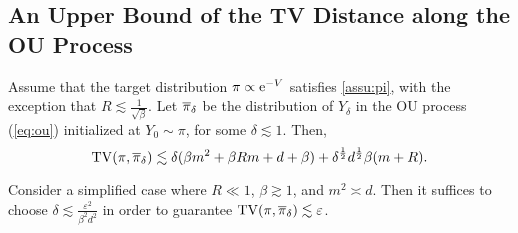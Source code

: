 \subsection{An Upper Bound of the TV Distance along the OU Process}
\label{app:prf:tv_ou}
\begin{lemma}
  Assume that the target distribution $\pi\propto\mathrm{e}^{-V}$ satisfies \cref{assu:pi}, with the exception that $R\lesssim\frac{1}{\sqrt{\beta}}$. Let $\overline{\pi}_\delta$ be the distribution of $Y_\delta$ in the OU process (\cref{eq:ou}) initialized at $Y_0\sim\pi$, for some $\delta\lesssim1$. Then,
  $$\operatorname{TV}(\pi,\overline{\pi}_\delta)\lesssim\delta(\beta m^2+\beta Rm+d+\beta)+\delta^{\frac12}d^{\frac12}\beta(m+R).$$ 
  \label{lem:ou_tv}
\end{lemma}
\begin{remark}
  Consider a simplified case where $R\ll1$, $\beta\gtrsim1$, and $m^2\asymp d$. Then it suffices to choose $\delta\lesssim\frac{\varepsilon^2}{\beta^2d^2}$ in order to guarantee $\operatorname{TV}(\pi,\overline{\pi}_\delta)\lesssim\varepsilon$.
\end{remark}

